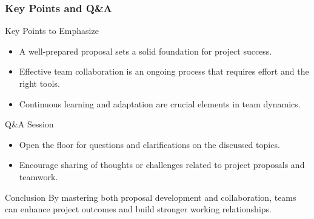 \documentclass[aspectratio=169]{beamer}
\begin{document}
\begin{frame}[fragile]
    \frametitle{Key Points and Q\&A}
    \begin{block}{Key Points to Emphasize}
        \begin{itemize}
            \item A well-prepared proposal sets a solid foundation for project success.
            \item Effective team collaboration is an ongoing process that requires effort and the right tools.
            \item Continuous learning and adaptation are crucial elements in team dynamics.
        \end{itemize}
    \end{block}

    \begin{block}{Q\&A Session}
        \begin{itemize}
            \item Open the floor for questions and clarifications on the discussed topics.
            \item Encourage sharing of thoughts or challenges related to project proposals and teamwork.
        \end{itemize}
    \end{block}
    
    \begin{block}{Conclusion}
        By mastering both proposal development and collaboration, teams can enhance project outcomes and build stronger working relationships.
    \end{block}
\end{frame}
\end{document}
